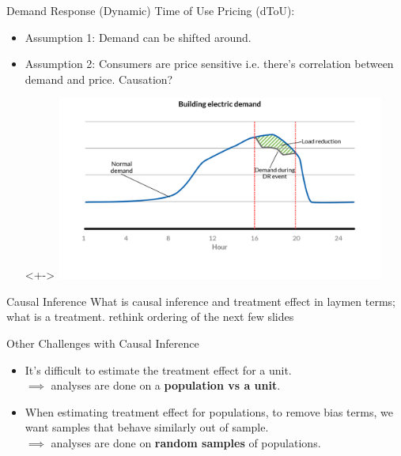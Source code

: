 \documentclass{beamer}
\begin{document}
\begin{frame}{Demand Response}
  (Dynamic) Time of Use Pricing (dToU):
  \begin{itemize}
    \item<+-> Assumption 1: Demand can be shifted around.
    \item<+-> Assumption 2: Consumers are price sensitive i.e. there's correlation between demand and price. Causation?
    \item[]<+->
    \vspace{0.2cm}
    \centering
    \includegraphics[width=0.85\textwidth]{images/demand-response.png}
  \end{itemize}
\end{frame}

\begin{frame}{Causal Inference}
  What is causal inference and treatment effect in laymen terms; what is a treatment.
  rethink ordering of the next few slides
\end{frame}

\begin{frame}{Other Challenges with Causal Inference}
  \begin{itemize}
    \item<+-> It's difficult to estimate the treatment effect for a unit. \\
    \indent $\implies$ analyses are done on a \textbf{population vs a unit}.
    \item<+-> When estimating treatment effect for populations, to remove bias terms, we want samples that behave similarly out of sample. \\
    \indent $\implies$ analyses are done on \textbf{random samples} of populations.
  \end{itemize}
\end{frame}
\end{document}
